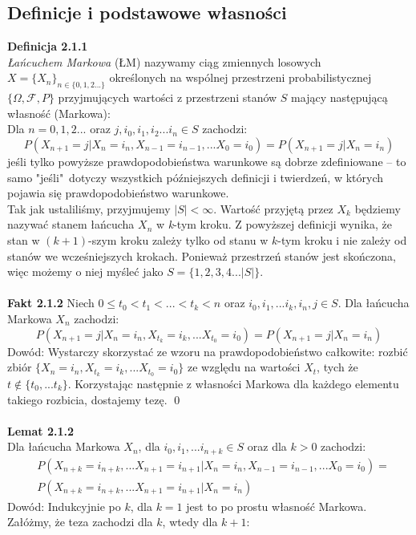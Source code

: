 \documentclass[a4paper]{article}
\begin{document}
\subsection{Definicje i podstawowe własności}
\textbf{Definicja 2.1.1}\\
\textit{Łańcuchem Markowa} (ŁM) nazywamy ciąg zmiennych losowych $X = \{X_n\}_{n \in \{0,1,2...\}}$ określonych na wspólnej przestrzeni probabilistycznej $\{\Omega, \mathcal{F}, P\}$ przyjmujących wartości z przestrzeni stanów $S$ mający następującą własność (Markowa):\\
Dla $n = 0, 1, 2...$ oraz $j, i_0, i_1, i_2 ... i_n \in S$ zachodzi: $$P(X_{n+1} = j | X_n = i_n, X_{n-1} = i_{n-1}, ... X_0 = i_0) = P(X_{n+1} = j| X_{n} = i_n)$$
jeśli tylko powyższe prawdopodobieństwa warunkowe są dobrze zdefiniowane – to samo "jeśli"\, dotyczy wszystkich późniejszych definicji i twierdzeń, w których pojawia się prawdopodobieństwo warunkowe.
\\Tak jak ustaliliśmy, przyjmujemy $|S| <\infty$. Wartość przyjętą przez $X_k$ będziemy nazywać stanem łańcucha $X_n$ w \textit{k}-tym kroku. Z powyższej definicji wynika, że stan w $(k+1)$-szym kroku zależy tylko od stanu w $k$-tym kroku i nie zależy od stanów we wcześniejszych krokach. Ponieważ przestrzeń stanów jest skończona, więc możemy o niej myśleć jako $S = \{1,2,3,4...|S|\}$.
\\\\
\textbf{Fakt 2.1.2}
Niech $0 \leq t_0 < t_1 < ... < t_k < n$ oraz $i_0, i_1, ... i_k, i_n, j \in S$. Dla łańcucha Markowa $X_n$ zachodzi:
$$P(X_{n+1} = j | X_n = i_n, X_{t_{k}} = i_k, ... X_{t_0} = i_0) = P(X_{n+1} = j| X_{n} = i_n)$$
Dowód: Wystarczy skorzystać ze wzoru na prawdopodobieństwo całkowite: rozbić zbiór $\{X_n = i_n, X_{t_{k}} = i_k, ... X_{t_0} = i_0\}$ ze względu na wartości $X_t$, tych że $t \notin \{t_0, ... t_k\}$. Korzystając następnie z własności Markowa dla każdego elementu takiego rozbicia, dostajemy tezę. \qed
\\\\
\textbf{Lemat 2.1.2}\\
Dla łańcucha Markowa $X_n$, dla $i_0, i_1, ... i_{n+k} \in S$ oraz dla $k > 0$ zachodzi:
\begin{align*}
&P(X_{n+k} = i_{n+k}, ...X_{n+1} = i_{n+1} | X_n = i_n, X_{n-1} = i_{n-1}, ... X_0 = i_0)=\\
&P(X_{n+k} = i_{n+k}, ...X_{n+1} = i_{n+1} | X_n = i_n)
\end{align*}
Dowód: Indukcyjnie po $k$, dla $k = 1$ jest to po prostu własność Markowa. Załóżmy, że teza zachodzi dla $k$, wtedy dla $k+1$:
\end{document}
